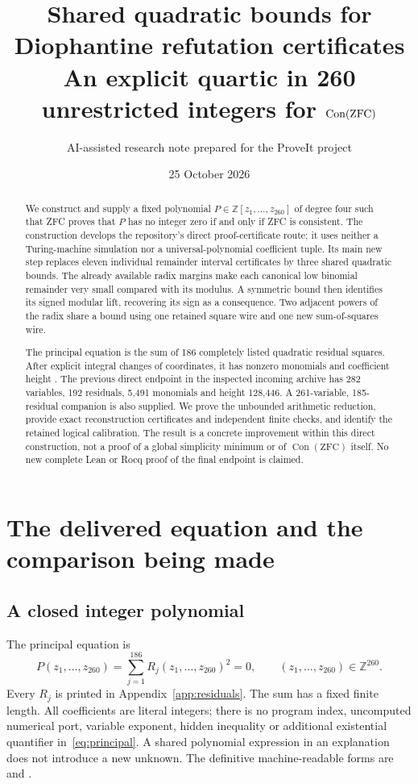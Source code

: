 \documentclass[10pt,letterpaper]{article}
\title{Shared quadratic bounds for Diophantine refutation certificates\\[4pt]
\large An explicit quartic in 260 unrestricted integers for $\Con(\mathrm{ZFC})$}
\author{AI-assisted research note prepared for the ProveIt project}
\date{25 October 2026}
\theoremstyle{definition}\newtheorem{definition}[theorem]{Definition}
\newcommand{\ZZ}{\mathbb Z}
\newcommand{\Con}{\operatorname{Con}}
\begin{document}
\maketitle
\begin{abstract}
We construct and supply a fixed polynomial $P\in\ZZ[z_1,\ldots,z_{260}]$
of degree four such that ZFC proves that $P$ has no integer zero if and only
if ZFC is consistent. The construction develops the repository's direct
proof-certificate route; it uses neither a Turing-machine simulation nor a
universal-polynomial coefficient tuple. Its main new step replaces eleven
individual remainder interval certificates by three shared quadratic bounds.
The already available radix margins make each canonical low binomial
remainder very small compared with its modulus. A symmetric bound then
identifies its signed modular lift, recovering its sign as a consequence.
Two adjacent powers of the radix share a bound using one retained square
wire and one new sum-of-squares wire.

The principal equation is the sum of 186 completely listed quadratic
residual squares. After explicit integral changes of coordinates, it has
\FinalTerms{} nonzero monomials and coefficient height \FinalHeight{}.
The previous direct endpoint in the inspected incoming archive has 282
variables, 192 residuals, 5,491 monomials and height 128,446. A 261-variable,
185-residual companion is also supplied. We prove the unbounded arithmetic
reduction, provide exact reconstruction certificates and independent finite
checks, and identify the retained logical calibration. The result is a
concrete improvement within this direct construction, not a proof of a
global simplicity minimum or of $\Con(\mathrm{ZFC})$ itself. No new complete
Lean or Rocq proof of the final endpoint is claimed.
\end{abstract}
\tableofcontents

\section{The delivered equation and the comparison being made}

\subsection{A closed integer polynomial}

The principal equation is
\begin{equation}\label{eq:principal}
 \boxed{\displaystyle P(z_1,\ldots,z_{260})
       =\sum_{j=1}^{186}R_j(z_1,\ldots,z_{260})^2=0,
       \qquad (z_1,\ldots,z_{260})\in\ZZ^{260}.}
\end{equation}
Every $R_j$ is printed in Appendix~\ref{app:residuals}. The sum has a fixed
finite length. All coefficients are literal integers; there is no program
index, uncomputed numerical port, variable exponent, hidden inequality or
additional existential quantifier in~\eqref{eq:principal}. A shared
polynomial expression in an explanation does not introduce a new unknown.
The definitive machine-readable forms are
 and
.
\end{document}
